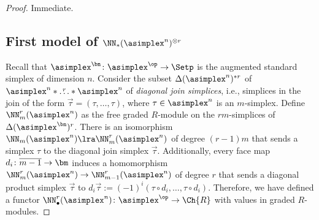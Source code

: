 \begin{proof} Immediate.\qedhere


\subsection{First model of $\NN_*(\asimplex^n)^{\otimes r}$} Recall that $\asimplex^{\bn}\colon \asimplex^{\op}\to \Setp$ is the augmented standard simplex of dimension $n$. Consider the subset $\Delta(\asimplex^n)^{*r}$ of $\asimplex^n * \overset{r}{\ldots}* \asimplex^n$ of \emph{diagonal join simplices}, i.e., simplices in the join of the form $\vec{\tau} = (\tau,\ldots,\tau)$, where $\tau\in \asimplex^n$ is an $m$-simplex. Define $\NN_m^r(\asimplex^n)$ as the free graded $R$-module on the $rm$-simplices of $\Delta(\asimplex^{\bn})^r$. There is an isomorphism $\NN_m(\asimplex^n)\lra \NN_m^r(\asimplex^n)$ of degree $(r-1)m$ that sends a simplex $\tau$ to the diagonal join simplex $\vec{\tau}$. Additionally, every face map $d_i\colon \overline{m-1}\to \bm$ induces a homomorphism $\NN_m^r(\asimplex^n)\to \NN_{m-1}^r(\asimplex^n)$ of degree $r$ that sends a diagonal product simplex $\vec{\tau}$ to $d_i\vec{\tau}:= (-1)^i(\tau\circ d_i,\ldots,\tau\circ d_i)$. Therefore, we have defined a functor $\NN_\bullet^r(\asimplex^n)\colon \asimplex^{\op}\to \Ch{R}$ with values in graded $R$-modules.


\end{proof}
